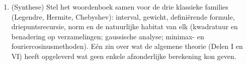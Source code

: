 \begin{problem}
\begin{enumerate}[resume]
        nevendiagonale elementen $\sqrt{b_1}, \dots,
        \sqrt{b_{n-1}}$. Toon met inductie aan dat $\det(tI_n -
        J_n) = p_n(t)$, zodat de wortels van $p_n$ de
        eigenwaarden van een reële symmetrische matrix zijn ---
        wat in één regel opnieuw bewijst dat ze reëel zijn, en
        (met de verstrengeling hierboven) de  aan de spectrale wereld van
        \cref{ch:b3:spectral} bindt.
  \item (Synthese) Stel het woordenboek samen voor de drie
        klassieke families (Legendre, Hermite, Chebyshev):
        interval, gewicht, definiërende formule,
        driepuntsrecursie, norm en de natuurlijke habitat van
        elk (kwadratuur en benadering op  verzamelingen;
        gaussische analyse; minimax- en
        fouriercosinusmethoden). Eén zin over wat de algemene
        theorie (Delen I en VI) heeft opgeleverd wat geen enkele
        afzonderlijke berekening kon geven.
\end{enumerate}


\end{problem}
